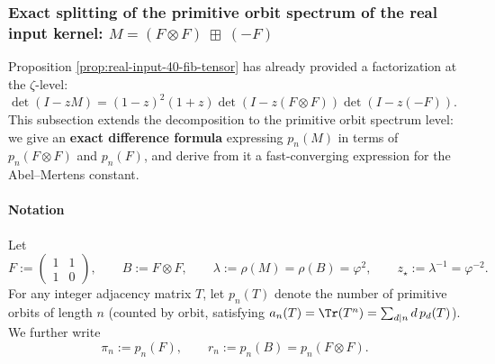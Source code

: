 \subsubsection{Exact splitting of the primitive orbit spectrum of the real input kernel: \texorpdfstring{$M=(F\otimes F)\ \boxplus\ (-F)$}{M=(F⊗F) boxplus (-F)}}\label{subsec:real-input-40-prime-splitting}
Proposition \ref{prop:real-input-40-fib-tensor} has already provided a factorization at the \(\zeta\)-level:
\(
\det(I-zM)=(1-z)^2(1+z)\det(I-z(F\otimes F))\det(I-z(-F))
\).
This subsection extends the decomposition to the primitive orbit spectrum level: we give an \textbf{exact difference formula} expressing \(p_n(M)\) in terms of \(p_n(F\otimes F)\) and \(p_n(F)\), and derive from it a fast-converging expression for the Abel--Mertens constant.

\paragraph{Notation}
Let
\[
F:=\begin{pmatrix}1&1\\[2pt]1&0\end{pmatrix},\qquad
B:=F\otimes F,
\qquad
\lambda:=\rho(M)=\rho(B)=\varphi^2,
\qquad
z_\star:=\lambda^{-1}=\varphi^{-2}.
\]
For any integer adjacency matrix \(T\), let \(p_n(T)\) denote the number of primitive orbits of length \(n\) (counted by orbit, satisfying \(a_n(T)=\Tr(T^n)=\sum_{d\mid n} d\,p_d(T)\)).
We further write
\[
\pi_n:=p_n(F),\qquad r_n:=p_n(B)=p_n(F\otimes F).
\]

